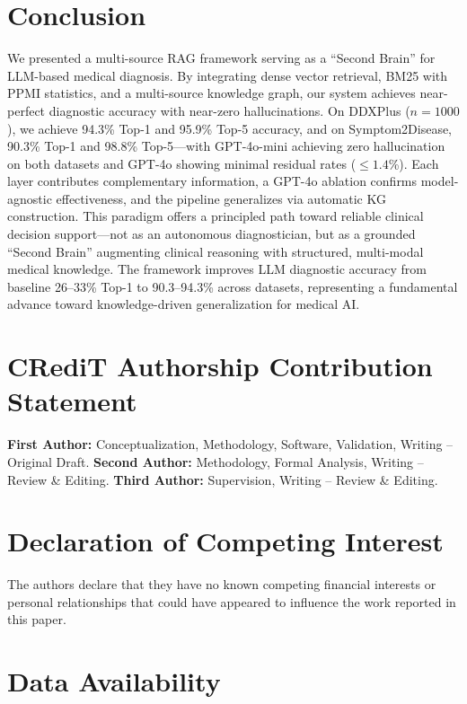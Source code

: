 \documentclass[preprint,12pt]{elsarticle}
\begin{document}
\section{Conclusion}
\label{sec:conclusion}

We presented a multi-source RAG framework serving as a ``Second Brain'' for LLM-based medical diagnosis. By integrating dense vector retrieval, BM25 with PPMI statistics, and a multi-source knowledge graph, our system achieves near-perfect diagnostic accuracy with near-zero hallucinations. On DDXPlus ($n{=}1000$), we achieve 94.3\% Top-1 and 95.9\% Top-5 accuracy, and on Symptom2Disease, 90.3\% Top-1 and 98.8\% Top-5---with GPT-4o-mini achieving zero hallucination on both datasets and GPT-4o showing minimal residual rates ($\leq 1.4$\%). Each layer contributes complementary information, a GPT-4o ablation confirms model-agnostic effectiveness, and the pipeline generalizes via automatic KG construction. This paradigm offers a principled path toward reliable clinical decision support---not as an autonomous diagnostician, but as a grounded ``Second Brain'' augmenting clinical reasoning with structured, multi-modal medical knowledge. The framework improves LLM diagnostic accuracy from baseline 26--33\% Top-1 to 90.3--94.3\% across datasets, representing a fundamental advance toward knowledge-driven generalization for medical AI.

\section*{CRediT Authorship Contribution Statement}

\textbf{First Author:} Conceptualization, Methodology, Software, Validation, Writing -- Original Draft.
\textbf{Second Author:} Methodology, Formal Analysis, Writing -- Review \& Editing.
\textbf{Third Author:} Supervision, Writing -- Review \& Editing.

\section*{Declaration of Competing Interest}

The authors declare that they have no known competing financial interests or personal relationships that could have appeared to influence the work reported in this paper.

\section*{Data Availability}
\end{document}
